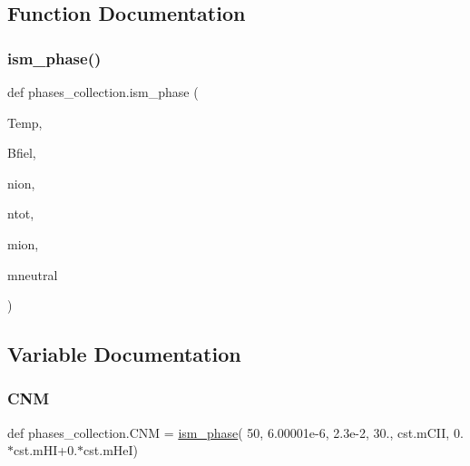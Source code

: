 \subsection{Function Documentation}
\mbox{\label{namespacephases__collection_aae55a1d8374bfc3868cd04555c049676}} 
\subsubsection{\texorpdfstring{ism\+\_\+phase()}{ism\_phase()}}
{\footnotesize\ttfamily def phases\+\_\+collection.\+ism\+\_\+phase (\begin{DoxyParamCaption}\item[{}]{Temp,  }\item[{}]{Bfiel,  }\item[{}]{nion,  }\item[{}]{ntot,  }\item[{}]{mion,  }\item[{}]{mneutral }\end{DoxyParamCaption})}



\subsection{Variable Documentation}
\mbox{\label{namespacephases__collection_aaeb80e44c07a5ff65c4c13bf597fd682}} 
\subsubsection{\texorpdfstring{C\+NM}{CNM}}
{\footnotesize\ttfamily def phases\+\_\+collection.\+C\+NM = \hyperlink{namespacephases__collection_aae55a1d8374bfc3868cd04555c049676}{ism\+\_\+phase}( 50, 6.\+00001e-\/6, 2.\+3e-\/2, 30., cst.\+m\+C\+I\+I, 0.$\ast$cst.\+m\+H\+I+0.$\ast$cst.\+m\+He\+I)}

\mbox{\label{namespacephases__collection_acf79414bea5ec0f4b82be487964ba138}} 
